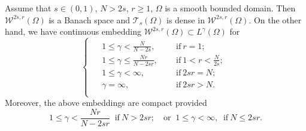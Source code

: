 \documentclass[10pt,a4paper]{amsart}
\begin{document}
\begin{proposition}\label{2302102144}
Assume that $s\in (0,1)$, $N>2s$, $r\ge 1$, $\Omega$ is a smooth bounded domain. Then $\mathcal{W}^{2s, r}(\Omega)$ is a Banach space and $\mathcal{T}_s(\Omega)$ is dense in $\mathcal{W}^{2s, r}(\Omega)$. On the other hand, we have continuous embedding $\mathcal{W}^{2s, r}(\Omega)\subset L^{\gamma}(\Omega)$ for
\begin{equation}\label{2302110107}
\begin{cases}
\begin{aligned}
&1\le \gamma<\frac{N}{N-2s}, \;\; &&\text{if}~ r=1;\\
&1\le \gamma\le\frac{Nr}{N-2sr}, \;\; &&\text{if}~1 < r < \frac{N}{2s};\\
&1\le \gamma<\infty,  && \text{if}~2sr = N;\\
& \gamma = \infty,  && \text{if}~ 2sr > N.\\
\end{aligned}
\end{cases}
\end{equation}
Moreover, the above embeddings are compact provided
\begin{equation}\label{2302110109}
1\le \gamma<\frac{Nr}{N-2sr}\;\;  \text{if}~N>2sr;\quad \mbox{or} \;\; 1\le \gamma<\infty, \;\; \text{if}~N\le 2sr.
\end{equation}
\end{proposition}
\end{document}
